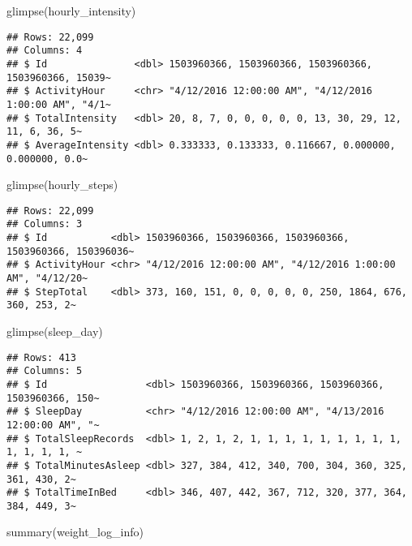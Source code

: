 \documentclass[
]{article}
\newenvironment{Shaded}{\begin{snugshade}}{\end{snugshade}}
\newcommand{\FunctionTok}[1]{\textcolor[rgb]{0.00,0.00,0.00}{#1}}
\newcommand{\NormalTok}[1]{#1}
\begin{document}
\begin{Shaded}
\begin{Highlighting}[]
\FunctionTok{glimpse}\NormalTok{(hourly\_intensity)}
\end{Highlighting}
\end{Shaded}

\begin{verbatim}
## Rows: 22,099
## Columns: 4
## $ Id               <dbl> 1503960366, 1503960366, 1503960366, 1503960366, 15039~
## $ ActivityHour     <chr> "4/12/2016 12:00:00 AM", "4/12/2016 1:00:00 AM", "4/1~
## $ TotalIntensity   <dbl> 20, 8, 7, 0, 0, 0, 0, 0, 13, 30, 29, 12, 11, 6, 36, 5~
## $ AverageIntensity <dbl> 0.333333, 0.133333, 0.116667, 0.000000, 0.000000, 0.0~
\end{verbatim}

\begin{Shaded}
\begin{Highlighting}[]
\FunctionTok{glimpse}\NormalTok{(hourly\_steps)}
\end{Highlighting}
\end{Shaded}

\begin{verbatim}
## Rows: 22,099
## Columns: 3
## $ Id           <dbl> 1503960366, 1503960366, 1503960366, 1503960366, 150396036~
## $ ActivityHour <chr> "4/12/2016 12:00:00 AM", "4/12/2016 1:00:00 AM", "4/12/20~
## $ StepTotal    <dbl> 373, 160, 151, 0, 0, 0, 0, 0, 250, 1864, 676, 360, 253, 2~
\end{verbatim}

\begin{Shaded}
\begin{Highlighting}[]
\FunctionTok{glimpse}\NormalTok{(sleep\_day)}
\end{Highlighting}
\end{Shaded}

\begin{verbatim}
## Rows: 413
## Columns: 5
## $ Id                 <dbl> 1503960366, 1503960366, 1503960366, 1503960366, 150~
## $ SleepDay           <chr> "4/12/2016 12:00:00 AM", "4/13/2016 12:00:00 AM", "~
## $ TotalSleepRecords  <dbl> 1, 2, 1, 2, 1, 1, 1, 1, 1, 1, 1, 1, 1, 1, 1, 1, 1, ~
## $ TotalMinutesAsleep <dbl> 327, 384, 412, 340, 700, 304, 360, 325, 361, 430, 2~
## $ TotalTimeInBed     <dbl> 346, 407, 442, 367, 712, 320, 377, 364, 384, 449, 3~
\end{verbatim}

\begin{Shaded}
\begin{Highlighting}[]
\FunctionTok{summary}\NormalTok{(weight\_log\_info)}
\end{Highlighting}
\end{Shaded}
\end{document}
